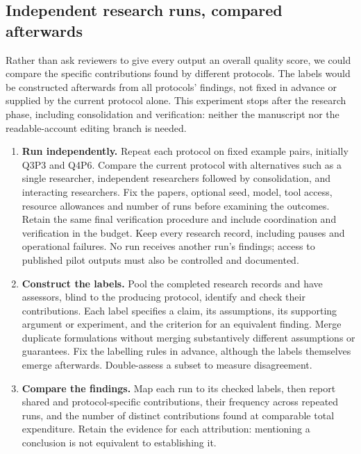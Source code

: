 \documentclass[11pt,a4paper]{article}
\newcommand{\pair}[1]{\mbox{#1}}
\begin{document}
\subsection{Independent research runs, compared afterwards}

Rather than ask reviewers to give every output an overall quality score, we
could compare the specific contributions found by different protocols. The
labels would be constructed afterwards from all protocols' findings, not
fixed in advance or supplied by the current protocol alone. This experiment
stops after the research phase, including consolidation and verification:
neither the manuscript nor the readable-account editing branch is needed.

\begin{enumerate}
\item \textbf{Run independently.} Repeat each protocol on fixed example pairs,
initially \pair{Q3P3} and \pair{Q4P6}. Compare the current protocol with alternatives
such as a single researcher, independent researchers followed by consolidation,
and interacting researchers. Fix the papers, optional seed, model, tool access,
resource allowances and number of runs before examining the outcomes. Retain
the same final verification procedure and include coordination and verification
in the budget. Keep every research record, including pauses and operational
failures. No run receives another run's findings; access to published pilot
outputs must also be controlled and documented.

\item \textbf{Construct the labels.} Pool the completed research records and
have assessors, blind to the producing protocol, identify and check their
contributions. Each label specifies a claim, its assumptions, its supporting
argument or experiment, and the criterion for an equivalent finding. Merge
duplicate formulations without merging substantively different assumptions
or guarantees. Fix the labelling rules in advance, although the labels
themselves emerge afterwards. Double-assess a subset to measure disagreement.

\item \textbf{Compare the findings.} Map each run to its checked labels, then
report shared and protocol-specific contributions, their frequency across
repeated runs, and the number of distinct contributions found at comparable
total expenditure. Retain the evidence for each attribution: mentioning a
conclusion is not equivalent to establishing it.
\end{enumerate}
\end{document}
